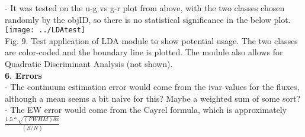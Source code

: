 \documentclass[12pt]{article}
\begin{document}
- It was tested on the u-g vs g-r plot from above, with the two classes chosen randomly by the objID, so there is no statistical significance in the below plot.\\
\texttt{[image: ../LDAtest]}\\
Fig. 9. Test application of LDA module to show potential usage. The two classes are color-coded and the boundary line is plotted. The module also allows for Quadratic Discriminant Analysis (not shown).\\
\textbf{6. Errors}\\
- The continuum estimation error would come from the ivar values for the fluxes, although a mean seems a bit naive for this? Maybe a weighted sum of some sort?\\
- The EW error would come from the Cayrel formula, which is approximately $\frac{1.5*\sqrt{(FWHM)\delta x}}{(S/N)}$
\end{document}
